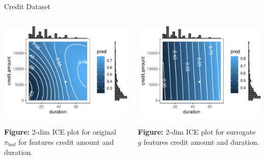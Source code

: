 \documentclass[11pt,compress,t,notes=noshow, xcolor=table]{beamer}
\begin{document}
\begin{vbframe}{Credit Dataset}
 \begin{columns}
	\begin{column}{0.47\textwidth}
		\begin{center}
		\includegraphics[width=1\textwidth]{figure/lime_credit_ice1.pdf}
		
		\tiny{\textbf{Figure:} 2-dim ICE plot for original $\pi_{bad}$ for features credit amount and duration.}
		\end{center}		
	\end{column}
	\begin{column}{0.46\textwidth}  
		\begin{center}
				\includegraphics[width=1\textwidth]{figure/lime_credit_ice2.pdf}
			
			\tiny{\textbf{Figure:} 2-dim ICE plot for surrogate $g$ features credit amount and duration.}
			
		\end{center}
			
	\end{column}
\end{columns}

\end{vbframe}
\end{document}

